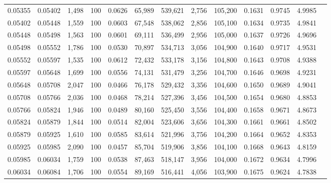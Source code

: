 \begin{tabular}{rrrrrrrrrrrrr}
0.05355 & 0.05402 & 1,498 & 100 &                                     0.0626 &  65,989 & 539,621 &   2,756 & 105,200 & 0.1631 & 0.9745 & 4.9985 \\
0.05402 & 0.05448 & 1,559 & 100 &                                     0.0603 &  67,548 & 538,062 &   2,856 & 105,100 & 0.1634 & 0.9735 & 4.9841 \\
0.05448 & 0.05498 & 1,563 & 100 &                                     0.0601 &  69,111 & 536,499 &   2,956 & 105,000 & 0.1637 & 0.9726 & 4.9696 \\
0.05498 & 0.05552 & 1,786 & 100 &                                     0.0530 &  70,897 & 534,713 &   3,056 & 104,900 & 0.1640 & 0.9717 & 4.9531 \\
0.05552 & 0.05597 & 1,535 & 100 &                                     0.0612 &  72,432 & 533,178 &   3,156 & 104,800 & 0.1643 & 0.9708 & 4.9388 \\
0.05597 & 0.05648 & 1,699 & 100 &                                     0.0556 &  74,131 & 531,479 &   3,256 & 104,700 & 0.1646 & 0.9698 & 4.9231 \\
0.05648 & 0.05708 & 2,047 & 100 &                                     0.0466 &  76,178 & 529,432 &   3,356 & 104,600 & 0.1650 & 0.9689 & 4.9041 \\
0.05708 & 0.05766 & 2,036 & 100 &                                     0.0468 &  78,214 & 527,396 &   3,456 & 104,500 & 0.1654 & 0.9680 & 4.8853 \\
0.05766 & 0.05824 & 1,946 & 100 &                                     0.0489 &  80,160 & 525,450 &   3,556 & 104,400 & 0.1658 & 0.9671 & 4.8673 \\
0.05824 & 0.05879 & 1,844 & 100 &                                     0.0514 &  82,004 & 523,606 &   3,656 & 104,300 & 0.1661 & 0.9661 & 4.8502 \\
0.05879 & 0.05925 & 1,610 & 100 &                                     0.0585 &  83,614 & 521,996 &   3,756 & 104,200 & 0.1664 & 0.9652 & 4.8353 \\
0.05925 & 0.05985 & 2,090 & 100 &                                     0.0457 &  85,704 & 519,906 &   3,856 & 104,100 & 0.1668 & 0.9643 & 4.8159 \\
0.05985 & 0.06034 & 1,759 & 100 &                                     0.0538 &  87,463 & 518,147 &   3,956 & 104,000 & 0.1672 & 0.9634 & 4.7996 \\
0.06034 & 0.06084 & 1,706 & 100 &                                     0.0554 &  89,169 & 516,441 &   4,056 & 103,900 & 0.1675 & 0.9624 & 4.7838 \\

\end{tabular}
